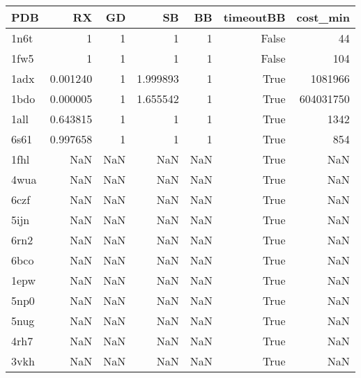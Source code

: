 \begin{tabular}{lrrrrrr}
\toprule
PDB & RX & GD & SB & BB & timeoutBB & cost_min \\
\midrule
1n6t & 1 & 1 & 1 & 1 & False & 44 \\
1fw5 & 1 & 1 & 1 & 1 & False & 104 \\
1adx & 0.001240 & 1 & 1.999893 & 1 & True & 1081966 \\
1bdo & 0.000005 & 1 & 1.655542 & 1 & True & 604031750 \\
1all & 0.643815 & 1 & 1 & 1 & True & 1342 \\
6s61 & 0.997658 & 1 & 1 & 1 & True & 854 \\
1fhl & NaN & NaN & NaN & NaN & True & NaN \\
4wua & NaN & NaN & NaN & NaN & True & NaN \\
6czf & NaN & NaN & NaN & NaN & True & NaN \\
5ijn & NaN & NaN & NaN & NaN & True & NaN \\
6rn2 & NaN & NaN & NaN & NaN & True & NaN \\
6bco & NaN & NaN & NaN & NaN & True & NaN \\
1epw & NaN & NaN & NaN & NaN & True & NaN \\
5np0 & NaN & NaN & NaN & NaN & True & NaN \\
5nug & NaN & NaN & NaN & NaN & True & NaN \\
4rh7 & NaN & NaN & NaN & NaN & True & NaN \\
3vkh & NaN & NaN & NaN & NaN & True & NaN \\
\bottomrule
\end{tabular}
